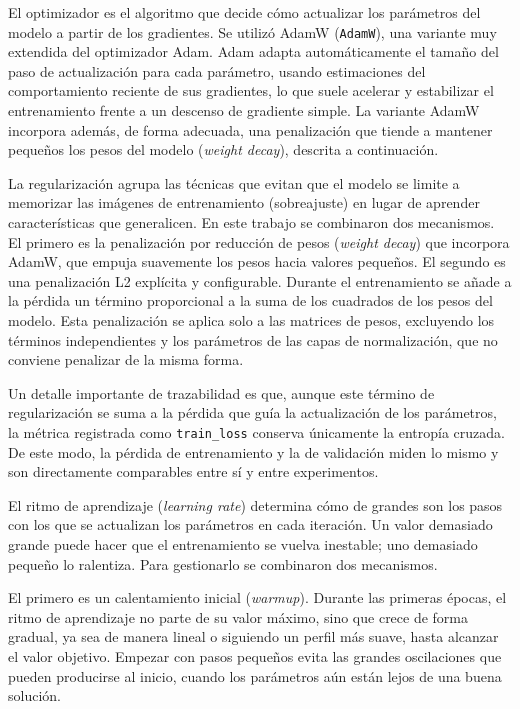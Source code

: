 El optimizador es el algoritmo que decide cómo actualizar los parámetros del modelo a partir de los gradientes. Se utilizó AdamW (\texttt{AdamW}), una variante muy extendida del optimizador Adam. Adam adapta automáticamente el tamaño del paso de actualización para cada parámetro, usando estimaciones del comportamiento reciente de sus gradientes, lo que suele acelerar y estabilizar el entrenamiento frente a un descenso de gradiente simple. La variante AdamW incorpora además, de forma adecuada, una penalización que tiende a mantener pequeños los pesos del modelo (\textit{weight decay}), descrita a continuación.

La regularización agrupa las técnicas que evitan que el modelo se limite a memorizar las imágenes de entrenamiento (sobreajuste) en lugar de aprender características que generalicen. En este trabajo se combinaron dos mecanismos. El primero es la penalización por reducción de pesos (\textit{weight decay}) que incorpora AdamW, que empuja suavemente los pesos hacia valores pequeños. El segundo es una penalización L2 explícita y configurable. Durante el entrenamiento se añade a la pérdida un término proporcional a la suma de los cuadrados de los pesos del modelo. Esta penalización se aplica solo a las matrices de pesos, excluyendo los términos independientes y los parámetros de las capas de normalización, que no conviene penalizar de la misma forma.

Un detalle importante de trazabilidad es que, aunque este término de regularización se suma a la pérdida que guía la actualización de los parámetros, la métrica registrada como \texttt{train\_loss} conserva únicamente la entropía cruzada. De este modo, la pérdida de entrenamiento y la de validación miden lo mismo y son directamente comparables entre sí y entre experimentos.

El ritmo de aprendizaje (\textit{learning rate}) determina cómo de grandes son los pasos con los que se actualizan los parámetros en cada iteración. Un valor demasiado grande puede hacer que el entrenamiento se vuelva inestable; uno demasiado pequeño lo ralentiza. Para gestionarlo se combinaron dos mecanismos.

El primero es un calentamiento inicial (\textit{warmup}). Durante las primeras épocas, el ritmo de aprendizaje no parte de su valor máximo, sino que crece de forma gradual, ya sea de manera lineal o siguiendo un perfil más suave, hasta alcanzar el valor objetivo. Empezar con pasos pequeños evita las grandes oscilaciones que pueden producirse al inicio, cuando los parámetros aún están lejos de una buena solución.

